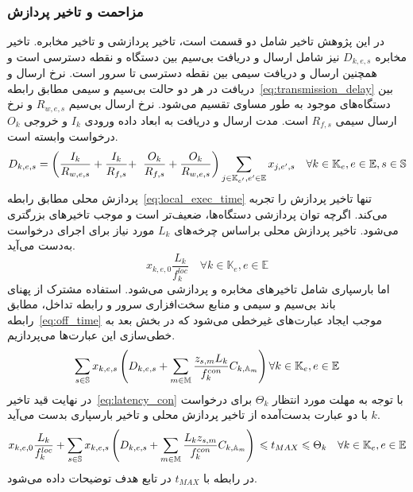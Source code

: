 \subsubsection{مزاحمت و تاخیر پردازش} \label{subsubsec:latency}
در این پژوهش تاخیر شامل دو قسمت است، تاخیر پردازشی و تاخیر مخابره. تاخیر مخابره $D_{k,e,s}$ نیز شامل ارسال و دریافت بی‌سیم بین دستگاه و نقطه دسترسی است و همچنین ارسال و دریافت سیمی بین نقطه دسترسی تا سرور است. نرخ ارسال و دریافت در هر دو حالت بی‌سیم و سیمی مطابق رابطه~\eqref{eq:transmission_delay} بین دستگاه‌های موجود به طور مساوی تقسیم می‌شود. نرخ ارسال بی‌سیم $R_{w,e,s}$ و نرخ ارسال سیمی $R_{f,s}$ است. مدت ارسال و دریافت به ابعاد داده ورودی $I_k$ و خروجی $O_k$ درخواست وابسته است.
\begin{equation} \label{eq:transmission_delay}
    D_{k,e,s} = \left(\frac{I_k}{R_{w,e,s}} + \frac{I_k}{R_{f,s}} + \right. \\ \left. \frac{O_k}{R_{f,s}} + \frac{O_k}{R_{w,e,s}} \right) \sum_{j \in \mathbb{K}_{e'}, e' \in \mathbb{E}} x_{j,e',s}  \quad \forall k \in \mathbb{K}_e, e \in \mathbb{E}, s \in \mathbb{S}
\end{equation}
پردازش محلی مطابق رابطه~\eqref{eq:local_exec_time} تنها تاخیر پردازش را تجربه می‌کند. اگرچه توان پردازشی دستگاه‌ها، ضعیف‌تر است و موجب تاخیرهای بزرگتری می‌شود. تاخیر پردازش محلی براساس چرخه‌های $L_k$ مورد نیاز برای اجرای درخواست به‌دست می‌آید. 
\begin{equation} \label{eq:local_exec_time}
    x_{k,e,0}\frac{L_k}{f^{loc}_k} \quad \forall k \in \mathbb{K}_e, e \in \mathbb{E}
\end{equation}
اما بارسپاری شامل تاخیرهای مخابره و پردازشی می‌شود. استفاده مشترک از پهنای باند بی‌سیم و سیمی و منابع سخت‌افزاری سرور و رابطه تداخل، مطابق رابطه~\eqref{eq:off_time} موجب ایجاد عبارت‌های غیرخطی می‌شود که در بخش بعد به خطی‌سازی این عبارت‌ها می‌پردازیم.
\begin{equation} \label{eq:off_time}
    \sum_{s \in \mathbb{S}} x_{k,e,s} \left(D_{k,e,s} + \sum_{m \in \mathbb{M}} \frac{z_{s,m} L_k}{f^{con}_k} C_{k,\mathbb{A}_m}\right) \\ \forall k \in \mathbb{K}_e, e \in \mathbb{E}
\end{equation}
در نهایت قید تاخیر~\eqref{eq:latency_con} با توجه به مهلت مورد انتظار $\Theta_k$ برای درخواست $k$ با دو عبارت بدست‌آمده از تاخیر پردازش محلی و تاخیر بارسپاری بدست می‌آید.
\begin{equation} \label{eq:latency_con}
    x_{k,e,0}\frac{L_k}{f^{loc}_k} + \sum_{s \in \mathbb{S}} x_{k,e,s} \left(D_{k,e,s} + \sum_{m \in \mathbb{M}}\frac{L_k z_{s,m}}{f^{con}_k} C_{k,\mathbb{A}_m}\right) \\ \leq t_{MAX} \leq \Theta_k \quad \forall k \in \mathbb{K}_e, e \in \mathbb{E}
\end{equation}
در رابطه با $t_{MAX}$ در تابع هدف توضیحات داده می‌شود.

